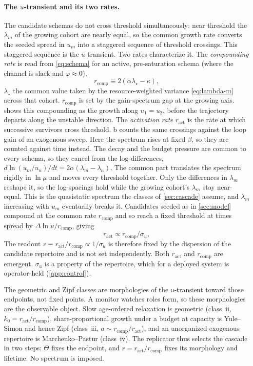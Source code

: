 \documentclass[
  aps,prx,
  reprint,
  superscriptaddress,
  nofootinbib,
  longbibliography
]{revtex4-2}
\newcommand{\sseed}{\sigma_{u}}
\newcommand{\ract}{r_{\mathrm{act}}}
\newcommand{\rcomp}{r_{\mathrm{comp}}}
\begin{document}
\paragraph{The $u$-transient and its two rates.} The candidate schemas do not cross threshold simultaneously: near threshold the $\lambda_m$ of the growing cohort are nearly equal, so the common growth rate converts the seeded spread in $u_m$ into a staggered sequence of threshold crossings. This staggered sequence is the $u$-transient. Two rates characterize it. The \emph{compounding rate} is read from \cref{eq:schema} for an active, pre-saturation schema (where the channel is slack and $\varphi\approx0$),
\begin{equation}\label{eq:g}
\rcomp\equiv 2(\alpha\lambda_\star-\kappa),
\end{equation}
$\lambda_\star$ the common value taken by the resource-weighted variance \cref{eq:lambda-m} across that cohort. $\rcomp$ is set by the gain-spectrum gap at the growing axis.  shows this compounding as the growth along $u_1=u_2$, before the trajectory departs along the unstable direction. The \emph{activation rate} $\ract$ is the rate at which successive survivors cross threshold. b counts the same crossings against the loop gain of an exogenous sweep. Here the spectrum rises at fixed $\beta$, so they are counted against time instead. The decay and the budget pressure are common to every schema, so they cancel from the log-differences, $d\ln(u_m/u_n)/dt=2\alpha(\lambda_m-\lambda_n)$. The common part translates the spectrum rigidly in $\ln\mu$ and moves every threshold together. Only the differences in $\lambda_m$ reshape it, so the log-spacings hold while the growing cohort's $\lambda_m$ stay near-equal. This is the quasistatic spectrum the classes of \cref{sec:cascade} assume, and $\lambda_m$ increasing with $u_m$ eventually breaks it. Candidates seeded as in \cref{sec:model} compound at the common rate $\rcomp$ and so reach a fixed threshold at times spread by $\Delta\ln u/\rcomp$, giving
\begin{equation}\label{eq:nu}
\ract\propto \rcomp/\sseed,
\end{equation}
The readout $r\equiv\ract/\rcomp\propto1/\sseed$ is therefore fixed by the dispersion of the candidate repertoire and is not set independently. Both $\ract$ and $\rcomp$ are emergent. $\sseed$ is a property of the repertoire, which for a deployed system is operator-held (\cref{app:control}).

The geometric and Zipf classes are morphologies of the $u$-transient toward those endpoints, not fixed points. A monitor watches roles form, so these morphologies are the observable object. Slow age-ordered relaxation is geometric (class~ii, $k_0=\ract/\rcomp$), share-proportional growth under a budget at capacity is Yule--Simon and hence Zipf (class~iii, $a\sim \rcomp/\ract$), and an unorganized exogenous repertoire is Marchenko--Pastur (class~iv). The replicator thus selects the cascade in two steps: $\Theta$ fixes the endpoint, and $r=\ract/\rcomp$ fixes its morphology and lifetime. No spectrum is imposed.
\end{document}
